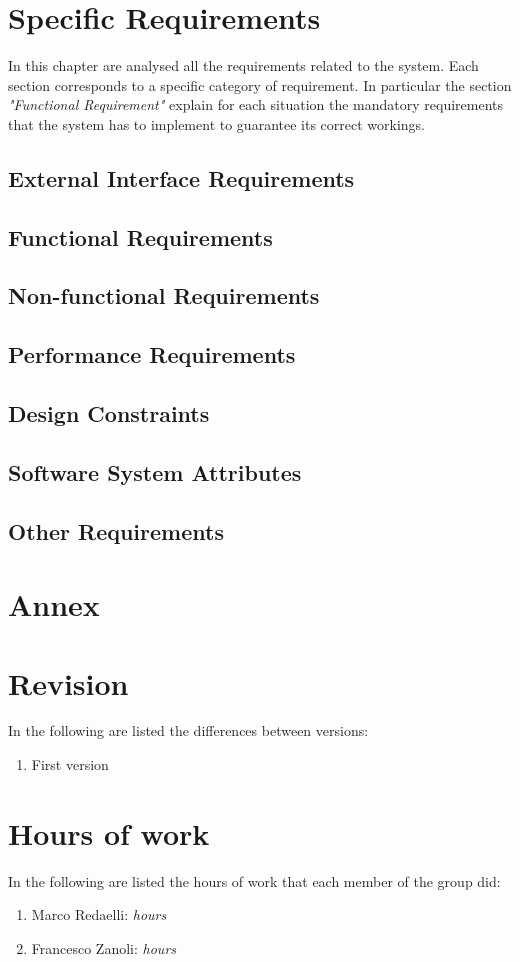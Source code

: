 \documentclass[]{report}
\begin{document}
\chapter{Specific Requirements}
In this chapter are analysed all the requirements related to the system. Each section corresponds to a specific category of requirement. In particular the section \emph{"Functional Requirement"} explain for each situation the mandatory requirements that the system has to implement to guarantee its correct workings. 
\section{External Interface Requirements }

\section{Functional Requirements}

\section{Non-functional Requirements}
\section{Performance Requirements}
\section{Design Constraints}
\section{Software System Attributes }
\section{Other Requirements}

\chapter{Annex}

\chapter*{Revision}
In the following are listed the differences between versions:
\begin{enumerate}
	\item First version
\end{enumerate}

\chapter*{Hours of work}
In the following are listed the hours of work that each member of the group did:
\begin{enumerate}
	\item Marco Redaelli:  \emph{hours}
	\item Francesco Zanoli: \emph{hours}
\end{enumerate}
\end{document}
